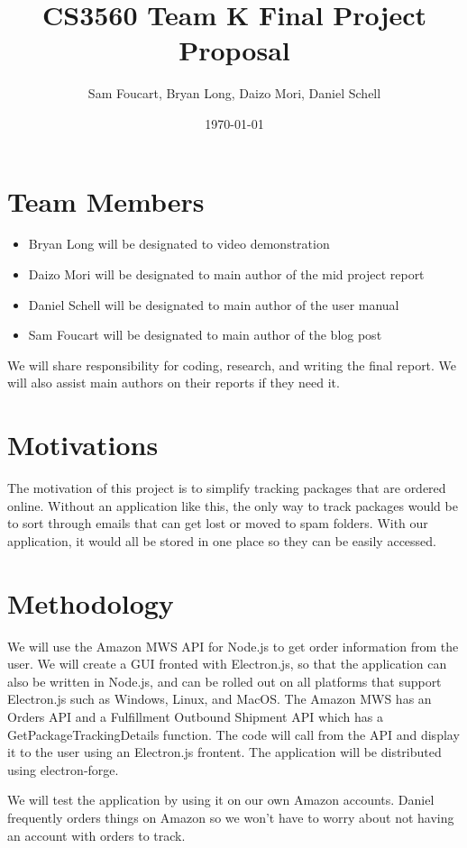 \documentclass[letter]{article}
\title{CS3560 Team K Final Project Proposal}
\author{Sam Foucart, Bryan Long, Daizo Mori, Daniel Schell}
\date{\today}
\begin{document}
\maketitle

\section*{Team Members}
\begin{itemize}
	\item Bryan Long will be designated to video demonstration
	\item Daizo Mori will be designated to main author of the mid project report
	\item Daniel Schell will be designated to main author of the user manual
	\item Sam Foucart will be designated to main author of the blog post
\end{itemize}

We will share responsibility for coding, research, and writing the final report. We will also assist main authors on their reports if they need it.

\section*{Motivations}

The motivation of this project is to simplify tracking packages that are ordered online. Without an application like this, the only way to track packages would be to sort through emails that can get lost or moved to spam folders. With our application, it would all be stored in one place so they can be easily accessed.

\section*{Methodology}

We will use the Amazon MWS API for Node.js to get order information from the user. We will create a GUI fronted with Electron.js, so that the application can also be written in Node.js, and can be rolled out on all platforms that support Electron.js such as Windows, Linux, and MacOS. The Amazon MWS has an Orders API and a Fulfillment Outbound Shipment API which has a GetPackageTrackingDetails function. The code will call from the API and display it to the user using an Electron.js frontent. The application will be distributed using electron-forge.

We will test the application by using it on our own Amazon accounts. Daniel frequently orders things on Amazon so we won't have to worry about not having an account with orders to track.
\end{document}
